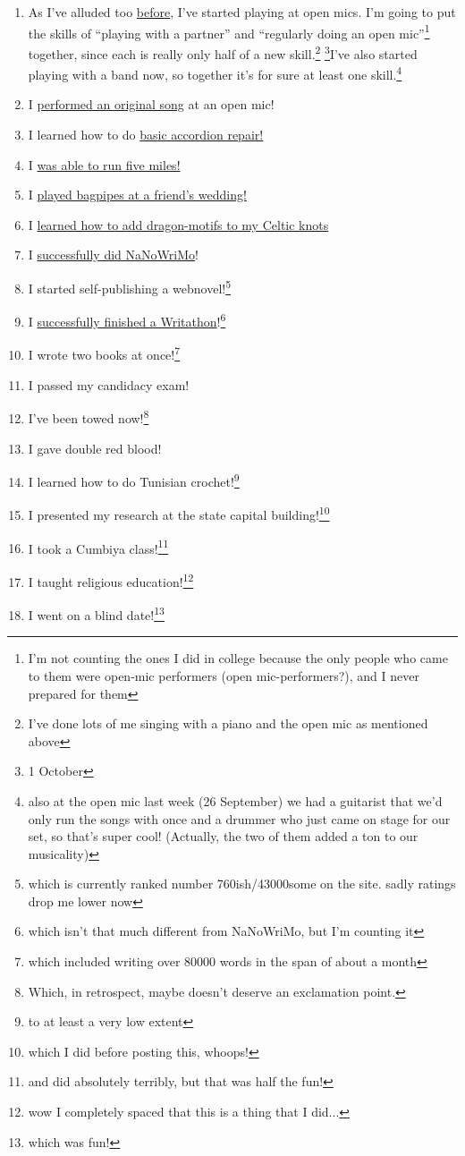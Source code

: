 \documentclass[12pt]{article}[titlepage]
\newcommand{\say}[1]{``#1''}
\newcommand{\1}{\={a}}
\newcommand{\2}{\={e}}
\newcommand{\3}{\={\i}}
\newcommand{\4}{\=o}
\newcommand{\5}{\=u}
\newcommand{\6}{\={A}}
\renewcommand{\,}{\textsuperscript{,}}
\begin{document}
\begin{enumerate}
\item As I've alluded too \href{open-mic-2.html}{before}, I've started playing at open mics.
I'm going to put the skills of \say{playing with a partner} and \say{regularly doing an open mic}\footnote{I'm not counting the ones I did in college because the only people who came to them were open-mic performers (open mic-performers?), and I never prepared for them} together, since each is really only half of a new skill.\footnote{I've done lots of me singing with a piano and the open mic as mentioned above} \footnote{1 October}I've also started playing with a band now, so together it's for sure at least one skill.\footnote{also at the open mic last week (26 September) we had a guitarist that we'd only run the songs with once and a drummer who just came on stage for our set, so that's super cool! (Actually, the two of them added a ton to our musicality)}
\item I \href{performing-a-song.html}{performed an original song} at an open mic!
\item I learned how to do \href{accordion-repair.html}{basic accordion repair!}
\item I \href{running-2.html}{was able to run five miles!} 
\item I \href{bagpipes.html}{played bagpipes at a friend's wedding!}
\item I \href{celtic-knots.html}{learned how to add dragon-motifs to my Celtic knots}
\item I \href{nanowrimo-4.html}{successfully did NaNoWriMo}!
\item I started self-publishing a webnovel!\footnote{which is currently ranked number 760ish/43000some on the site. sadly ratings drop me lower now}
\item I \href{writathon-23-april.html}{successfully finished a Writathon}!\footnote{which isn't that much different from NaNoWriMo, but I'm counting it}
\item I wrote two books at once!\footnote{which included writing over 80000 words in the span of about a month}
\item I passed my candidacy exam!
\item I've been towed now!\footnote{Which, in retrospect, maybe doesn't deserve an exclamation point.}
\item I gave double red blood!
\item I learned how to do Tunisian crochet!\footnote{to at least a very low extent}
\item I presented my research at the state capital building!\footnote{which I did before posting this, whoops!}
\item I took a Cumbiya class!\footnote{and did absolutely terribly, but that was half the fun!}
\item I taught religious education!\footnote{wow I completely spaced that this is a thing that I did...}
\item I went on a blind date!\footnote{which was fun!}
\end{enumerate}
\end{document}
